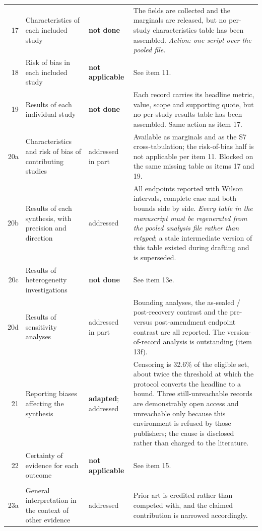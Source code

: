 \documentclass[11pt,a4paper]{article}
\begin{document}
{\begin{longtable}{@{}rL{3.5cm}L{2.6cm}L{6.2cm}@{}}
17 & Characteristics of each included study & \textbf{not done} & The fields are collected and the marginals are released, but no per-study characteristics table has been assembled. \emph{Action: one script over the pooled file.} \\
18 & Risk of bias in each included study & \textbf{not applicable} & See item 11. \\
19 & Results of each individual study & \textbf{not done} & Each record carries its headline metric, value, scope and supporting quote, but no per-study results table has been assembled. Same action as item 17. \\
20a & Characteristics and risk of bias of contributing studies & addressed in part & Available as marginals and as the S7 cross-tabulation; the risk-of-bias half is not applicable per item 11. Blocked on the same missing table as items 17 and 19. \\
20b & Results of each synthesis, with precision and direction & addressed & All endpoints reported with Wilson intervals, complete case and both bounds side by side. \emph{Every table in the manuscript must be regenerated from the pooled analysis file rather than retyped}; a stale intermediate version of this table existed during drafting and is superseded. \\
20c & Results of heterogeneity investigations & \textbf{not done} & See item 13e. \\
20d & Results of sensitivity analyses & addressed in part & Bounding analyses, the as-sealed / post-recovery contrast and the pre- versus post-amendment endpoint contrast are all reported. The version-of-record analysis is outstanding (item 13f). \\
21 & Reporting biases affecting the synthesis & \textbf{adapted}; addressed & Censoring is 32.6\% of the eligible set, about twice the threshold at which the protocol converts the headline to a bound. Three still-unreachable records are demonstrably open access and unreachable only because this environment is refused by those publishers; the cause is disclosed rather than charged to the literature. \\
22 & Certainty of evidence for each outcome & \textbf{not applicable} & See item 15. \\
\addlinespace
{} \\
23a & General interpretation in the context of other evidence & addressed & Prior art is credited rather than competed with, and the claimed contribution is narrowed accordingly. \\

\end{longtable}}
\end{document}
